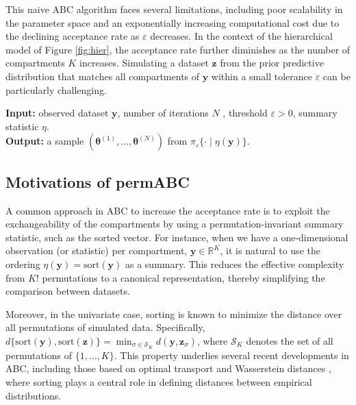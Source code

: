 \documentclass[lineno]{biometrika}
\def\obsdata{\mathbf{y}}
\def\param{\boldsymbol{\theta}}
\def\simdata{\mathbf{z}}
\def\eps{\varepsilon}
\begin{document}
This naive ABC algorithm faces several limitations, including poor scalability in the parameter space and an exponentially increasing computational cost due to the declining acceptance rate as \( \varepsilon \) decreases. In the context of the hierarchical model of Figure \ref{fig:hier}, the acceptance rate further diminishes as the number of compartments \( K \) increases. Simulating a dataset \( \simdata \) from the prior predictive distribution that matches all compartments of \( \obsdata \) within a small tolerance \( \varepsilon \) can be particularly challenging. 



\begin{algorithm}
\label{alg:abc_vanilla}
\caption{Vanilla Approximate Bayesian Computation}
\textbf{Input: }observed dataset $\obsdata$, number of iterations $N$ , threshold $\eps>0$, summary statistic $\eta$.\\
\textbf{Output: }a sample $(\param^{(1)}, \dots, \param^{(N)})$ from $\pi_\eps\{\cdot\mid\eta(\obsdata)\}$.\\

\BlankLine

\For{$i = 1,\dots, N$}{
    \Repeat{$d\{\eta(\simdata^{(i)}),\eta(\obsdata)\})\leq \eps$}{
        $\param^{(i)} \sim \pi(\cdot)$\;
        $\simdata^{(i)}\sim f(\cdot\mid\param^{(i)})$\;
        }
    }
\end{algorithm}


\subsection{Motivations of permABC}

A common approach in ABC to increase the acceptance rate is to exploit the exchangeability of the compartments by using a permutation-invariant summary statistic, such as the sorted vector. For instance, when we have a one-dimensional observation (or statistic) per compartment, $\obsdata \in \mathbb{R}^K$, it is natural to use the ordering $\eta(\obsdata) = \text{sort}(\obsdata)$ as a summary. This reduces the effective complexity from $K!$ permutations to a canonical representation, thereby simplifying the comparison between datasets.

Moreover, in the univariate case, sorting is known to minimize the distance over all permutations of simulated data. Specifically, $d\{\text{sort}(\obsdata), \text{sort}(\simdata)\} = \min_{\sigma \in \mathcal{S}_K} d(\obsdata, \simdata_{\sigma})$, where $\mathcal{S}_K$ denotes the set of all permutations of $\{1,\dots,K\}$. This property underlies several recent developments in ABC, including those based on optimal transport and Wasserstein distances \citep{bernton2019approximate}, where sorting plays a central role in defining distances between empirical distributions.
\end{document}
